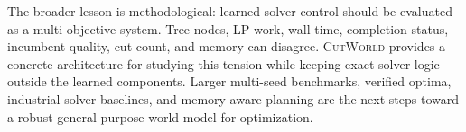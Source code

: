 \documentclass{article}
\newcommand{\CutWorld}{\textsc{CutWorld}}
\begin{document}
The broader lesson is methodological: learned solver control should be evaluated as a multi-objective system. Tree nodes, LP work, wall time, completion status, incumbent quality, cut count, and memory can disagree. \CutWorld{} provides a concrete architecture for studying this tension while keeping exact solver logic outside the learned components. Larger multi-seed benchmarks, verified optima, industrial-solver baselines, and memory-aware planning are the next steps toward a robust general-purpose world model for optimization.







\end{document}
